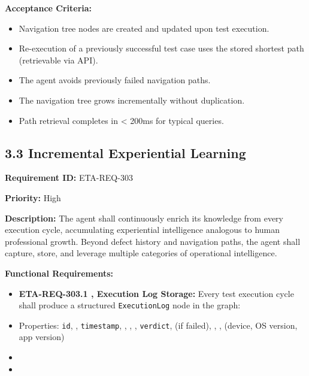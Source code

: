 \textbf{Acceptance Criteria:}
\begin{itemize}[leftmargin=1.4em,itemsep=1pt,topsep=3pt]
  \item Navigation tree nodes are created and updated upon test execution.
  \item Re-execution of a previously successful test case uses the stored shortest path (retrievable via API).
  \item The agent avoids previously failed navigation paths.
  \item The navigation tree grows incrementally without duplication.
  \item Path retrieval completes in < 200ms for typical queries.
\end{itemize}

\subsection*{3.3 Incremental Experiential Learning}

\textbf{Requirement ID:} ETA-REQ-303

\textbf{Priority:} High

\textbf{Description:}
The agent shall continuously enrich its knowledge from every execution cycle, accumulating experiential intelligence analogous to human professional growth. Beyond defect history and navigation paths, the agent shall capture, store, and leverage multiple categories of operational intelligence.

\textbf{Functional Requirements:}

\begin{itemize}[leftmargin=1.4em,itemsep=1pt,topsep=3pt]
  \item \textbf{ETA-REQ-303.1 ,  Execution Log Storage:} Every test execution cycle shall produce a structured \texttt{ExecutionLog} node in the graph:
  \item Properties: \texttt{id}, , \texttt{timestamp}, , , , \texttt{verdict},  (if failed), , ,  (device, OS version, app version)
  \item {}
  \item {}
\end{itemize}

